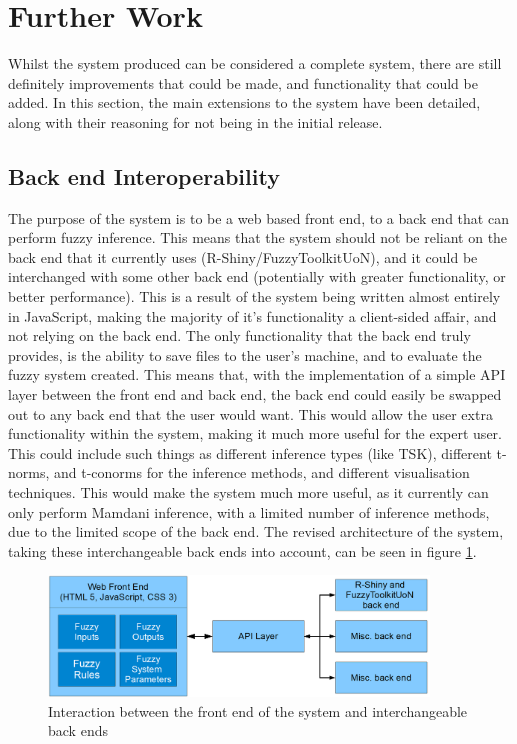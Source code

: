 \section{Further Work}
Whilst the system produced can be considered a complete system, there are still definitely improvements that could be made, and functionality that could be added. In this section, the main extensions to the system have been detailed, along with their reasoning for not being in the initial release. 

\subsection{Back end Interoperability}
\label{sec:bei}
The purpose of the system is to be a web based front end, to a back end that can perform fuzzy inference. This means that the system should not be reliant on the back end that it currently uses (R-Shiny/FuzzyToolkitUoN), and it could be interchanged with some other back end (potentially with greater functionality, or better performance). This is a result of the system being written almost entirely in JavaScript, making the majority of it's functionality a client-sided affair, and not relying on the back end. The only functionality that the back end truly provides, is the ability to save files to the user's machine, and to evaluate the fuzzy system created. This means that, with the implementation of a simple API layer between the front end and back end, the back end could easily be swapped out to any back end that the user would want. This would allow the user extra functionality within the system, making it much more useful for the expert user. This could include such things as different inference types (like TSK), different t-norms, and t-conorms for the inference methods, and different visualisation techniques. This would make the system much more useful, as it currently can only perform Mamdani inference, with a limited number of inference methods, due to the limited scope of the back end. The revised architecture of the system, taking these interchangeable back ends into account, can be seen in figure \ref{fig:fw-interop}.

\begin{figure}[ht!]
	\begin{center}
		\includegraphics[width=0.9\textwidth]{images/archi-new}
	\end{center}
	\vspace{-2mm}
	\caption{Interaction between the front end of the system and interchangeable back ends}
	\label{fig:fw-interop}
	\vspace{-1mm}
\end{figure}

